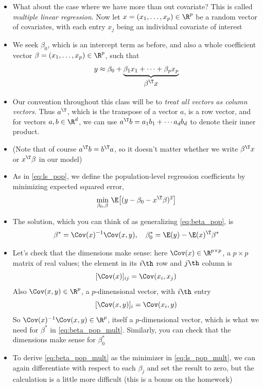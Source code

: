 \documentclass{article}
\begin{document}
\begin{itemize}
\item What about the case where we have more than out covariate? This is called
  \emph{multiple linear regression}. Now let $x = (x_1, \dots, x_p) \in \R^p$
  be a random vector of covariates, with each entry $x_j$ being an individual
  covariate of interest

\item We seek $\beta_0$, which is an intercept term as before, and also a whole 
  coefficient vector $\beta = (x_1, \dots, x_p) \in \R^p$, such that 
  \[
  y \approx \beta_0 + \underbrace{\beta_1 x_1 + \cdots + \beta_p
    x_p}_{\textstyle \begin{array}{c} \beta^\T x \end{array}}
  \]

\item Our convention throughout this class will be to \emph{treat all vectors as 
    column vectors}. Thus $a^\T$, which is the transpose of a vector $a$, is a
  row vector, and for vectors $a,b \in \R^d$, we can use $a^\T b = a_1 b_1 +
  \cdots a_d b_d$ to denote their inner product. 

\item (Note that of course $a^\T b = b^\T a$, so it doesn't matter whether we
  write $\beta^\T x$ or $x^\T \beta$ in our model)

\item As in \eqref{eq:ls_pop}, we define the population-level regression
  coefficients by minimizing expected squared error,   
  \begin{equation}
  \label{eq:ls_pop_mult}
  \min_{\beta_0, \beta} \, \E\big[ (y - \beta_0 - x^\T \beta)^2 \big]
  \end{equation}

\item The solution, which you can think of as generalizing \eqref{eq:beta_pop},
  is 
  \begin{equation}
  \label{eq:beta_pop_mult}
  \beta^* = \Cov(x)^{-1} \Cov(x, y), \quad 
  \beta^*_0 = \E(y) - \E(x)^\T \beta^*
  \end{equation}

\item Let's check that the dimensions make sense: here $\Cov(x) \in \R^{p
    \times  p}$, a $p \times p$ matrix of real values; the element in its $i\th$
  row and $j\th$ column is   
  \[
  [\Cov(x)]_{ij} = \Cov(x_i, x_j)
  \]
  Also $\Cov(x, y) \in \R^p$, a $p$-dimensional vector, with $i\th$ entry
  \[
  [\Cov(x, y)]_i = \Cov(x_i, y)
  \]
  So $\Cov(x)^{-1} \Cov(x, y) \in \R^p$, itself a $p$-dimensional vector, which
  is what we need for $\beta^*$ in \eqref{eq:beta_pop_mult}. Similarly, you can
  check that the dimensions make sense for $\beta^*_0$ 

\item To derive \eqref{eq:beta_pop_mult} as the minimizer in
  \eqref{eq:ls_pop_mult}, we can again differentiate with respect to each
  $\beta_j$ and set the result to zero, but the calculation is a little more
  difficult (this is a bonus on the homework) 
\end{itemize}
\end{document}
